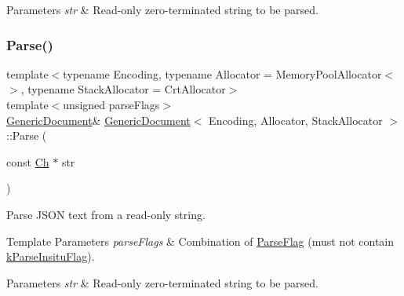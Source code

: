 \begin{DoxyParams}{Parameters}
{\em str} & Read-\/only zero-\/terminated string to be parsed. \\
\hline
\end{DoxyParams}
\mbox{\label{a01996_a5e377f840009b5cee6757be29525ce0b}} 
\subsubsection{\texorpdfstring{Parse()}{Parse()}\hspace{0.1cm}{\footnotesize\ttfamily [2/3]}}
{\footnotesize\ttfamily template$<$typename Encoding, typename Allocator = Memory\+Pool\+Allocator$<$$>$, typename Stack\+Allocator = Crt\+Allocator$>$ \\
template$<$unsigned parse\+Flags$>$ \\
\hyperlink{a01996}{Generic\+Document}\& \hyperlink{a01996}{Generic\+Document}$<$ Encoding, Allocator, Stack\+Allocator $>$\+::Parse (\begin{DoxyParamCaption}\item[{const \hyperlink{a01992_ade0e0ce64ccd5d852da57a35e720bafb}{Ch} $\ast$}]{str }\end{DoxyParamCaption})\hspace{0.3cm}{\ttfamily [inline]}}



Parse J\+S\+ON text from a read-\/only string. 


\begin{DoxyTemplParams}{Template Parameters}
{\em parse\+Flags} & Combination of \hyperlink{a00563_ab7be7dabe6ffcba60fad441505583450}{Parse\+Flag} (must not contain \hyperlink{a00563_ab7be7dabe6ffcba60fad441505583450a13188bd483b4df0b6582bebe2aeb5b01}{k\+Parse\+Insitu\+Flag}). \\
\hline
\end{DoxyTemplParams}

\begin{DoxyParams}{Parameters}
{\em str} & Read-\/only zero-\/terminated string to be parsed. \\
\hline
\end{DoxyParams}
\mbox{\label{a01996_a49ae6de6fd0bc820d9864a106c10b4da}} 
